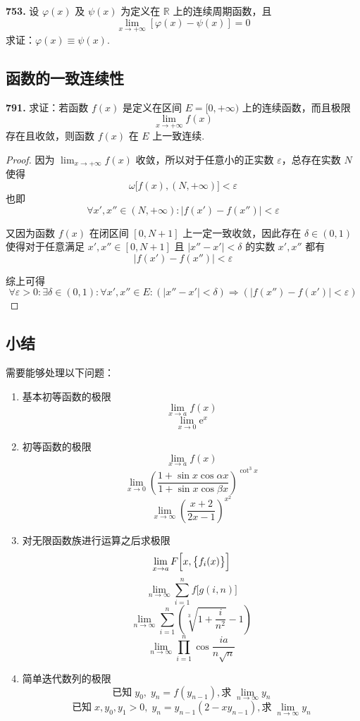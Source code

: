 \textbf{753.} 设 $\varphi(x)$ 及 $\psi(x)$ 为定义在 $\mathbb{R}$ 上的连续周期函数，且
\[\lim_{x \rightarrow +\infty} [\varphi(x) - \psi(x)] = 0\]
求证：$\varphi(x) \equiv \psi(x)$.

\subsection{函数的一致连续性}

\textbf{791.} 求证：若函数 $f(x)$ 是定义在区间 $E = [0, +\infty)$ 上的连续函数，而且极限
\[\lim_{x \rightarrow +\infty} f(x)\]
存在且收敛，则函数 $f(x)$ 在 $E$ 上一致连续.

\begin{proof}
    因为 $\displaystyle \lim_{x \rightarrow +\infty} f(x)$ 收敛，所以对于任意小的正实数 $\varepsilon$，总存在实数 $N$ 使得
    \[\omega\bigl[f(x), (N, +\infty)\bigr] < \varepsilon\]
    也即
    \[\forall x',x'' \in (N, +\infty): \lvert f(x') - f(x'')\rvert < \varepsilon\]

    又因为函数 $f(x)$ 在闭区间 $[0,N+1]$ 上一定一致收敛，因此存在 $\delta \in (0,1)$ 使得对于任意满足 $x',x'' \in [0, N+1]$ 且 $\lvert x'' - x'\rvert < \delta$ 的实数 $x',x''$ 都有
    \[\lvert f(x') - f(x'')\rvert < \varepsilon\]

    综上可得
    \[\forall \varepsilon > 0: \exists \delta \in (0,1): \forall x',x'' \in E: (\lvert x'' - x'\rvert < \delta) \Rightarrow (\lvert f(x'') - f(x')\rvert < \varepsilon)\]
\end{proof}

\subsection{小结}
需要能够处理以下问题：

\begin{enumerate}
    \item 基本初等函数的极限
    \[\lim_{x \rightarrow a} f(x)\]
    \[\lim_{x \rightarrow 0} \mathrm{e}^{x}\]
    \item 初等函数的极限
    \[\lim_{x \rightarrow a} f(x)\]
    \[\lim_{x \rightarrow 0} \left(\frac{1 + \sin x \cos \alpha x}{1 + \sin x \cos \beta x}\right)^{\cot^3 x}\]
    \[\lim_{x \rightarrow \infty} \left(\frac{x + 2}{2x - 1}\right)^{x^2}\]
    \item 对无限函数族进行运算之后求极限
    \[\lim_{x \rightarrow a} F\Bigl[x,\bigl\{f_i(x)\bigr\}\Bigr]\]
    \[\lim_{n \rightarrow \infty} \sum_{i=1}^{n} f\bigl[g(i,n)\bigr]\]
    \[\lim_{n \rightarrow \infty} \sum_{i=1}^{n} \left(\sqrt[3]{1 + \frac{i}{n^2}} - 1\right)\]
    \[\lim_{n \rightarrow \infty} \prod_{i=1}^{n} \cos \frac{ia}{n\sqrt{n}}\]
    \item 简单迭代数列的极限
    \[\text{已知} \;y_0,\; y_n = f(y_{n-1}), \text{求} \;\lim_{n \rightarrow \infty} y_n\]
    \[\text{已知} \;x, y_0, y_1 > 0,\; y_n = y_{n-1} (2 - xy_{n-1}), \text{求} \;\lim_{n \rightarrow \infty} y_n\]
\end{enumerate}